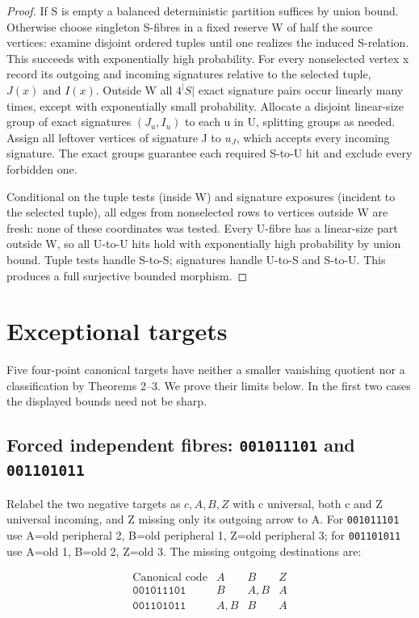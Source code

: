 \documentclass[11pt]{article}
\begin{document}
\begin{proof} If S is empty a balanced deterministic partition suffices by union bound. Otherwise choose singleton S-fibres in a fixed reserve W of half the source vertices: examine disjoint ordered tuples until one realizes the induced S-relation. This succeeds with exponentially high probability. For every nonselected vertex x record its outgoing and incoming signatures relative to the selected tuple, $J(x) \text{ and } I(x)$. Outside W all $4^{|}S|$ exact signature pairs occur linearly many times, except with exponentially small probability. Allocate a disjoint linear-size group of exact signatures $(J_{u},I_{u})$ to each u in U, splitting groups as needed. Assign all leftover vertices of signature J to $u_{J}$, which accepts every incoming signature. The exact groups guarantee each required S-to-U hit and exclude every forbidden one.

Conditional on the tuple tests (inside W) and signature exposures (incident to the selected tuple), all edges from nonselected rows to vertices outside W are fresh: none of these coordinates was tested. Every U-fibre has a linear-size part outside W, so all U-to-U hits hold with exponentially high probability by union bound. Tuple tests handle S-to-S; signatures handle U-to-S and S-to-U. This produces a full surjective bounded morphism.
\end{proof}

\section{Exceptional targets}

Five four-point canonical targets have neither a smaller vanishing quotient nor a classification by Theorems 2--3. We prove their limits below. In the first two cases the displayed bounds need not be sharp.

\subsection{Forced independent fibres: \texttt{001011101} and \texttt{001101011}}

Relabel the two negative targets as $c,A,B,Z$ with c universal, both c and Z universal incoming, and Z missing only its outgoing arrow to A. For \texttt{001011101} use A=old peripheral 2, B=old peripheral 1, Z=old peripheral 3; for \texttt{001101011} use A=old 1, B=old 2, Z=old 3. The missing outgoing destinations are:

\[
\begin{array}{c|ccc}\text{Canonical code}&A&B&Z\\\hline
\texttt{001011101}&B&A,B&A\\
\texttt{001101011}&A,B&B&A\end{array}
\]
\end{document}
